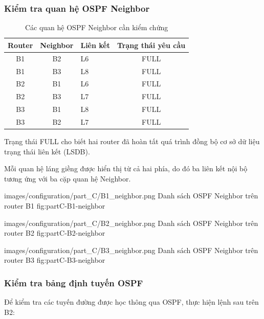 \subsubsection{Kiểm tra quan hệ OSPF Neighbor}

\begin{table}[H]
\centering
\caption{Các quan hệ OSPF Neighbor cần kiểm chứng}
\label{tab:partC-neighbor}
\small
\begin{tabularx}{\textwidth}{c c X c}
\toprule
\textbf{Router} &
\textbf{Neighbor} &
\textbf{Liên kết} &
\textbf{Trạng thái yêu cầu} \\
\midrule
B1 & B2 & L6 & FULL \\
B1 & B3 & L8 & FULL \\
B2 & B1 & L6 & FULL \\
B2 & B3 & L7 & FULL \\
B3 & B1 & L8 & FULL \\
B3 & B2 & L7 & FULL \\
\bottomrule
\end{tabularx}
\end{table}

Trạng thái FULL cho biết
hai router đã hoàn tất quá trình
đồng bộ cơ sở dữ liệu trạng thái
liên kết (LSDB).

Mỗi quan hệ láng giềng được
hiển thị từ cả hai phía, do đó
ba liên kết nội bộ tương ứng
với ba cặp quan hệ Neighbor.


\partzeroimage
{images/configuration/part_C/B1_neighbor.png}
{Danh sách OSPF Neighbor trên router B1}
{fig:partC-B1-neighbor}

\partzeroimage
{images/configuration/part_C/B2_neighbor.png}
{Danh sách OSPF Neighbor trên router B2}
{fig:partC-B2-neighbor}

\partzeroimage
{images/configuration/part_C/B3_neighbor.png}
{Danh sách OSPF Neighbor trên router B3}
{fig:partC-B3-neighbor}

\newpage


\subsubsection{Kiểm tra bảng định tuyến OSPF}

Để kiểm tra các tuyến đường
được học thông qua OSPF,
thực hiện lệnh sau trên B2:

